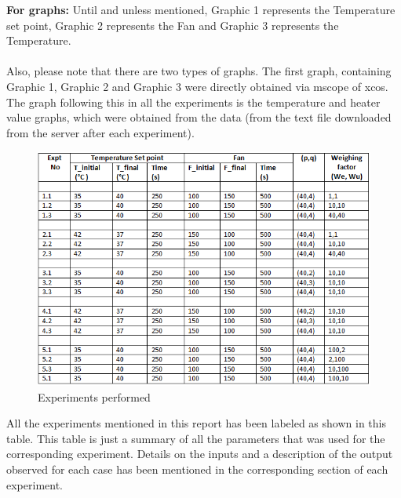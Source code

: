 \textbf{For graphs:} Until and unless mentioned, Graphic 1 represents the Temperature set point, Graphic 2 represents the Fan and Graphic 3 represents the Temperature. \\ \\
Also, please note that there are two types of graphs. The first graph, containing Graphic 1, Graphic 2 and Graphic 3 were directly obtained via mscope of xcos. The graph following this in all the experiments is the temperature and heater value graphs, which were obtained from the data (from the text file downloaded from the server after each experiment).
\begin{figure}[H]
\centering
  \includegraphics[width=0.7\linewidth]{mpc/table_normal.png}
  \caption{Experiments performed}
\end{figure}
All the experiments mentioned in this report has been labeled as shown in this table. This table is just a summary of all the parameters that was used for the corresponding experiment. Details on the inputs and a description of the output observed for each case has been mentioned in the corresponding section of each experiment.


